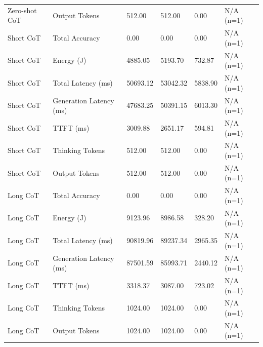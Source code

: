 \begin{table}
\begin{tabular}{llllll}
Zero-shot CoT & Output Tokens & 512.00 & 512.00 & 0.00 & N/A (n=1) \\
Short CoT & Total Accuracy & 0.00 & 0.00 & 0.00 & N/A (n=1) \\
Short CoT & Energy (J) & 4885.05 & 5193.70 & 732.87 & N/A (n=1) \\
Short CoT & Total Latency (ms) & 50693.12 & 53042.32 & 5838.90 & N/A (n=1) \\
Short CoT & Generation Latency (ms) & 47683.25 & 50391.15 & 6013.30 & N/A (n=1) \\
Short CoT & TTFT (ms) & 3009.88 & 2651.17 & 594.81 & N/A (n=1) \\
Short CoT & Thinking Tokens & 512.00 & 512.00 & 0.00 & N/A (n=1) \\
Short CoT & Output Tokens & 512.00 & 512.00 & 0.00 & N/A (n=1) \\
Long CoT & Total Accuracy & 0.00 & 0.00 & 0.00 & N/A (n=1) \\
Long CoT & Energy (J) & 9123.96 & 8986.58 & 328.20 & N/A (n=1) \\
Long CoT & Total Latency (ms) & 90819.96 & 89237.34 & 2965.35 & N/A (n=1) \\
Long CoT & Generation Latency (ms) & 87501.59 & 85993.71 & 2440.12 & N/A (n=1) \\
Long CoT & TTFT (ms) & 3318.37 & 3087.00 & 723.02 & N/A (n=1) \\
Long CoT & Thinking Tokens & 1024.00 & 1024.00 & 0.00 & N/A (n=1) \\
Long CoT & Output Tokens & 1024.00 & 1024.00 & 0.00 & N/A (n=1) \\
\bottomrule
\end{tabular}
\end{table}
